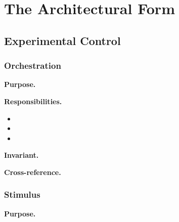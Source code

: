 
\section{The Architectural Form}



\subsection{Experimental Control}

  \subsubsection{Orchestration}
  \textbf{Purpose.} %

  \textbf{Responsibilities.}
  \begin{itemize}
    \item %
    \item %
    \item %
  \end{itemize}

  \textbf{Invariant.} %

  \textbf{Cross-reference.} %

  \subsubsection{Stimulus}
  \textbf{Purpose.} %

